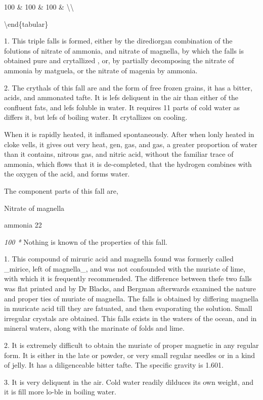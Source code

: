 \documentclass{article}
\begin{document}
100 \& 100 \& 100 \& \textbackslash{}\textbackslash{}

\textbackslash{}end\{tabular\}

1. This triple falls is formed, either by the dirediorgan combination of the folutions of nitrate of ammonia, and nitrate of magnella, by which the falls is obtained pure and crytallized , or, by partially decomposing the nitrate of ammonia by matguela, or the nitrate of magenia by ammonia.

2. The crythals of this fall are and the form of free frozen grains, it has a bitter, acids, and ammonated tafte. It is lefs deliquent in the air than either of the confluent fats, and lefs foluble in water. It requires 11 parts of cold water as differs it, but lefs of boiling water. It crytallizes on cooling.

When it is rapidly heated, it inflamed spontaneously. After when lonly heated in cloke vells, it gives out very heat, gen, gas, and gas, a greater proportion of water than it contains, nitrous gas, and nitric acid, without the familiar trace of ammonia, which flows that it is de-completed, that the hydrogen combines with the oxygen of the acid, and forms water.

The component parts of this fall are,

Nitrate of magnella

ammonia 22

\textit{100 *}
Nothing is known of the properties of this fall.

1. This compound of miruric acid and magnella found was formerly called \_mirice, left of magnella\_, and was not confounded with the muriate of lime, with which it is frequently recommended. The difference between thefe two falls was flat printed and by Dr Blacks, and Bergman afterwards examined the nature and proper ties of muriate of magnella. The falls is obtained by differing magnella in muricate acid till they are fatuated, and then evaporating the solution. Small irregular crystals are obtained. This falls exists in the waters of the ocean, and in mineral waters, along with the marinate of folds and lime.

2. It is extremely difficult to obtain the muriate of proper magnetic in any regular form. It is either in the late or powder, or very small regular needles or in a kind of jelly. It has a diligenceable bitter tafte. The specific gravity is 1.601.

3. It is very deliquent in the air. Cold water readily dilduces its own weight, and it is fill more lo-ble in boiling water.
\end{document}
